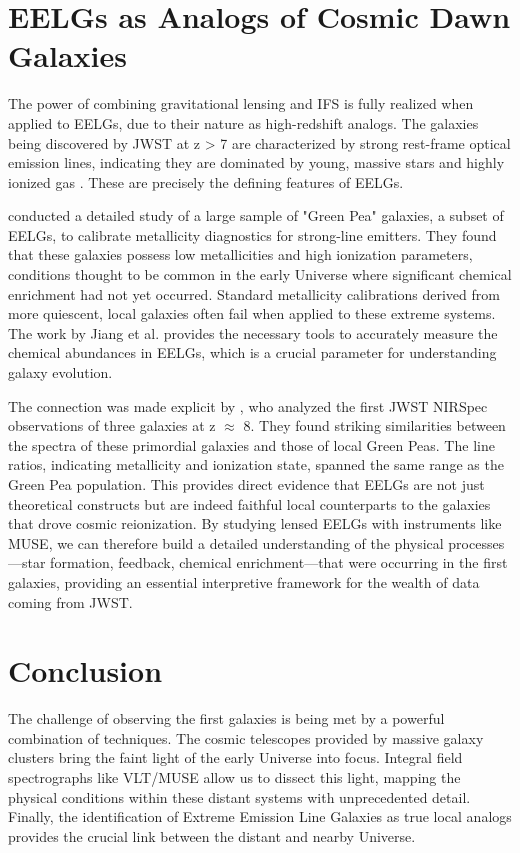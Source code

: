 \documentclass[fleqn,usenatbib]{mnras}
\begin{document}
\section{EELGs as Analogs of Cosmic Dawn Galaxies}

The power of combining gravitational lensing and IFS is fully realized when applied to EELGs, due to their nature as high-redshift analogs. The galaxies being discovered by JWST at z > 7 are characterized by strong rest-frame optical emission lines, indicating they are dominated by young, massive stars and highly ionized gas \citep{Rhoads2023}. These are precisely the defining features of EELGs.

\citet{Jiang2019} conducted a detailed study of a large sample of "Green Pea" galaxies, a subset of EELGs, to calibrate metallicity diagnostics for strong-line emitters. They found that these galaxies possess low metallicities and high ionization parameters, conditions thought to be common in the early Universe where significant chemical enrichment had not yet occurred. Standard metallicity calibrations derived from more quiescent, local galaxies often fail when applied to these extreme systems. The work by Jiang et al. provides the necessary tools to accurately measure the chemical abundances in EELGs, which is a crucial parameter for understanding galaxy evolution.

The connection was made explicit by \citet{Rhoads2023}, who analyzed the first JWST NIRSpec observations of three galaxies at z $\approx$ 8. They found striking similarities between the spectra of these primordial galaxies and those of local Green Peas. The line ratios, indicating metallicity and ionization state, spanned the same range as the Green Pea population. This provides direct evidence that EELGs are not just theoretical constructs but are indeed faithful local counterparts to the galaxies that drove cosmic reionization. By studying lensed EELGs with instruments like MUSE, we can therefore build a detailed understanding of the physical processes—star formation, feedback, chemical enrichment—that were occurring in the first galaxies, providing an essential interpretive framework for the wealth of data coming from JWST.

\section{Conclusion}

The challenge of observing the first galaxies is being met by a powerful combination of techniques. The cosmic telescopes provided by massive galaxy clusters bring the faint light of the early Universe into focus. Integral field spectrographs like VLT/MUSE allow us to dissect this light, mapping the physical conditions within these distant systems with unprecedented detail. Finally, the identification of Extreme Emission Line Galaxies as true local analogs provides the crucial link between the distant and nearby Universe.
\end{document}

